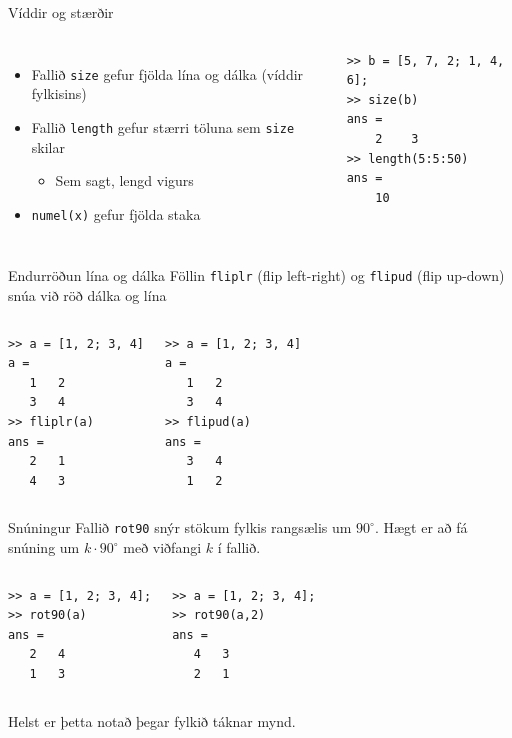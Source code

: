 \documentclass[handout]{beamer}
\begin{document}
\begin{frame}[fragile]{Víddir og stærðir}
\begin{columns}
\begin{itemize}
 \item Fallið \texttt{size} gefur fjölda lína og dálka (víddir fylkisins)
 \item Fallið \texttt{length} gefur stærri töluna sem \texttt{size} skilar
 \begin{itemize}
  \item Sem sagt, lengd vigurs
 \end{itemize}
 \item \texttt{numel(x)} gefur fjölda staka
\end{itemize}
\begin{verbatim}
>> b = [5, 7, 2; 1, 4, 6];
>> size(b)
ans = 
    2    3
>> length(5:5:50)
ans = 
    10
\end{verbatim}
\end{columns}
\end{frame}

\begin{frame}[fragile]{Endurröðun lína og dálka}
\vspace{\baselineskip}
Föllin \texttt{fliplr} (flip left-right) og \texttt{flipud} (flip up-down) snúa við röð dálka og lína
\begin{columns}
\begin{verbatim}
>> a = [1, 2; 3, 4]
a =
   1   2
   3   4
>> fliplr(a)
ans =
   2   1
   4   3
\end{verbatim}
\begin{verbatim}
>> a = [1, 2; 3, 4]
a =
   1   2
   3   4
>> flipud(a)
ans =
   3   4
   1   2
\end{verbatim}
\end{columns}
\end{frame}

\begin{frame}[fragile]{Snúningur}
\vspace{\baselineskip}
Fallið \texttt{rot90} snýr stökum fylkis rangsælis um $90^\circ$. Hægt er að fá snúning um $k\cdot90^\circ$ með viðfangi $k$ í fallið.
\begin{columns}
\begin{verbatim}
>> a = [1, 2; 3, 4];
>> rot90(a)
ans =
   2   4
   1   3
\end{verbatim}
\begin{verbatim}
>> a = [1, 2; 3, 4];
>> rot90(a,2)
ans =
   4   3
   2   1
\end{verbatim}
\end{columns}
\vspace{\baselineskip}
Helst er þetta notað þegar fylkið táknar mynd.
\end{frame}
\end{document}
